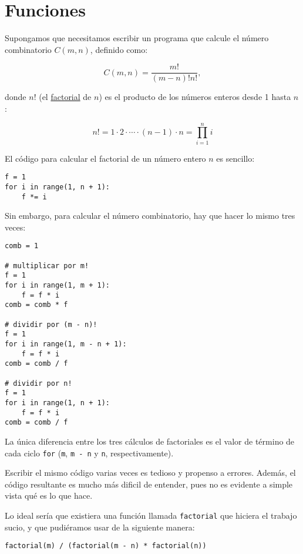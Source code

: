 \chapter{Funciones}

Supongamos que necesitamos escribir un programa que calcule el
  número combinatorio
\(C(m, n)\), definido como:

\[C(m, n) = \frac{m!}{(m - n)! n!},\]

donde \(n!\) (el \href{http://es.wikipedia.org/wiki/Factorial}{factorial}
de \(n\)) es el producto de los números enteros desde 1 hasta \(n\):

\[n! = 1\cdot 2\cdot\cdots\cdot(n - 1)\cdot n = \prod_{i=1}^n i\]

El código para calcular el factorial de un número entero \(n\) es
sencillo:

\begin{lstlisting}
f = 1
for i in range(1, n + 1):
    f *= i
\end{lstlisting}

Sin embargo, para calcular el número combinatorio, hay que hacer lo
mismo tres veces:

\begin{lstlisting}
comb = 1

# multiplicar por m!
f = 1
for i in range(1, m + 1):
    f = f * i
comb = comb * f

# dividir por (m - n)!
f = 1
for i in range(1, m - n + 1):
    f = f * i
comb = comb / f

# dividir por n!
f = 1
for i in range(1, n + 1):
    f = f * i
comb = comb / f
\end{lstlisting}

La única diferencia entre los tres cálculos de factoriales es el valor
de término de cada ciclo \lstinline!for! (\lstinline!m!,
\lstinline!m - n! y \lstinline!n!, respectivamente).

Escribir el mismo código varias veces es tedioso y propenso a errores.
Además, el código resultante es mucho más dificil de entender, pues no
es evidente a simple vista qué es lo que hace.

Lo ideal sería que existiera una función llamada \lstinline!factorial!
que hiciera el trabajo sucio, y que pudiéramos usar de la siguiente
manera:

\begin{lstlisting}
factorial(m) / (factorial(m - n) * factorial(n))
\end{lstlisting}

